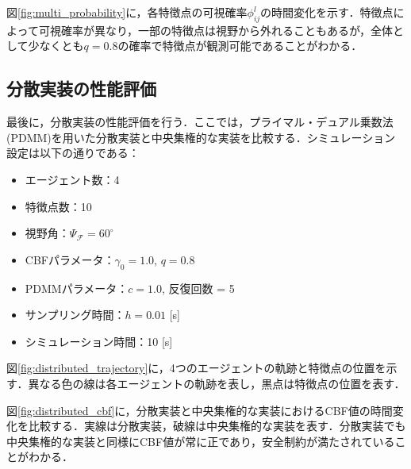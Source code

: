 
図\ref{fig:multi_probability}に，各特徴点の可視確率$\phi_{ij}^l$の時間変化を示す．特徴点によって可視確率が異なり，一部の特徴点は視野から外れることもあるが，全体として少なくとも$q = 0.8$の確率で特徴点が観測可能であることがわかる．


\subsection{分散実装の性能評価}

最後に，分散実装の性能評価を行う．ここでは，プライマル・デュアル乗数法(PDMM)を用いた分散実装と中央集権的な実装を比較する．シミュレーション設定は以下の通りである：
\begin{itemize}
\item エージェント数：4
\item 特徴点数：10
\item 視野角：$\Psi_\mathcal{F} = 60^\circ$
\item CBFパラメータ：$\gamma_0 = 1.0$, $q = 0.8$
\item PDMMパラメータ：$c = 1.0$, 反復回数 = 5
\item サンプリング時間：$h = 0.01$ [s]
\item シミュレーション時間：10 [s]
\end{itemize}

図\ref{fig:distributed_trajectory}に，4つのエージェントの軌跡と特徴点の位置を示す．異なる色の線は各エージェントの軌跡を表し，黒点は特徴点の位置を表す．


図\ref{fig:distributed_cbf}に，分散実装と中央集権的な実装におけるCBF値の時間変化を比較する．実線は分散実装，破線は中央集権的な実装を表す．分散実装でも中央集権的な実装と同様にCBF値が常に正であり，安全制約が満たされていることがわかる．


